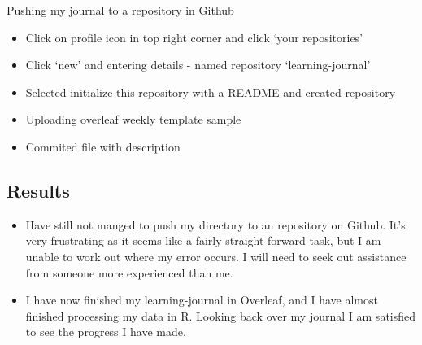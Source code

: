 \documentclass{article}
\begin{document}
Pushing my journal to a repository in Github
\begin{itemize}
\item Click on profile icon in top right corner and click ‘your repositories’
\item Click ‘new’ and entering details - named repository ‘learning-journal’
\item Selected initialize this repository with a README and created repository
\item Uploading overleaf weekly template sample
\item Commited file with description
\end{itemize}
 


\subsection{Results}
\begin{itemize}
    \item Have still not manged to push my directory to an repository on Github. It's very frustrating as it seems like a fairly straight-forward task, but I am unable to work out where my error occurs. I will need to seek out assistance from someone more experienced than me. 
    \item I have now finished my learning-journal in Overleaf, and I have almost finished processing my data in R. Looking back over my journal I am satisfied to see the progress I have made. 
\end{itemize}
\end{document}
